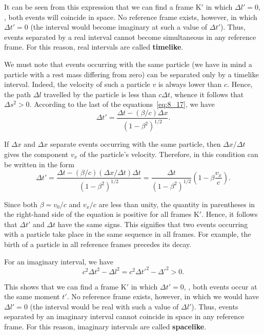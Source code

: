 \noindent
It can be seen from this expression that we can find a frame K$'$ in which $\Delta l'=0$, \ie, both events will coincide in space. No reference frame exists, however, in which $\Delta t'=0$ (the interval would become imaginary at such a value of $\Delta t'$). Thus, events separated by a real interval cannot become simultaneous in any reference frame. For this reason, real intervals are called \textbf{timelike}.

We must note that events occurring with the same particle (we have in mind a particle with a rest mass differing from zero) can be separated only by a timelike interval. Indeed, the velocity of such a particle $v$ is always lower than $c$. Hence, the path $\Delta l$ travelled by the particle is less than $c\Delta t$, whence it follows that $\Delta s^2>0$. According to the last of the equations~\eqref{eq:8_17}, we have
\begin{equation}\label{eq:8_26}
	\Delta t' = \frac{\Delta t - (\beta/c) \Delta x}{\left(1 - \beta^2\right)^{1/2}}.
\end{equation}

\noindent
If $\Delta x$ and $\Delta x$ separate events occurring with the same particle, then $\Delta x/\Delta t$ gives the component $v_x$ of the particle's velocity. Therefore,  in this condition can be written in the form
\begin{equation*}
	\Delta t' = \frac{\Delta t - (\beta/c)(\Delta x/\Delta t)\Delta t}{\left(1 - \beta^2\right)^{1/2}} = \frac{\Delta t}{\left(1 - \beta^2\right)^{1/2}}\left(1 - \beta \frac{v_x}{c}\right).
\end{equation*}

\noindent
Since both $\beta=v_0/c$ and $v_x/c$ are less than unity, the quantity in parentheses in the right-hand side of the equation is positive for all frames K$'$. Hence, it follows that $\Delta t'$ and $\Delta t$ have the same signs. This signifies that two events occurring with a particle take place in the same sequence in all frames. For example, the birth of a particle in all reference frames precedes its decay.

For an imaginary interval, we have
\begin{equation*}
	c^2\Delta t^2 - \Delta l^2 = c^2\Delta t'^2 - \Delta '^2 > 0.
\end{equation*}

\noindent
This shows that we can find a frame K$'$ in which $\Delta t'=0$, \ie, both events occur at the same moment $t'$. No reference frame exists, however, in which we would have $\Delta l'=0$ (the interval would be real with such a value of $\Delta l'$). Thus, events separated by an imaginary interval cannot coincide in space in any reference frame. For this reason, imaginary intervals are called \textbf{spacelike}.

